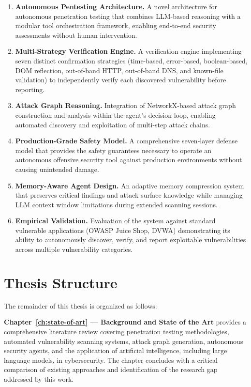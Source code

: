 \begin{enumerate}[label=\textbf{C\arabic*.}]
    \item \textbf{Autonomous Pentesting Architecture.} A novel architecture for autonomous penetration testing that combines LLM-based reasoning with a modular tool orchestration framework, enabling end-to-end security assessments without human intervention.
    \item \textbf{Multi-Strategy Verification Engine.} A verification engine implementing seven distinct confirmation strategies (time-based, error-based, boolean-based, DOM reflection, out-of-band HTTP, out-of-band DNS, and known-file validation) to independently verify each discovered vulnerability before reporting.
    \item \textbf{Attack Graph Reasoning.} Integration of NetworkX-based attack graph construction and analysis within the agent's decision loop, enabling automated discovery and exploitation of multi-step attack chains.
    \item \textbf{Production-Grade Safety Model.} A comprehensive seven-layer defense model that provides the safety guarantees necessary to operate an autonomous offensive security tool against production environments without causing unintended damage.
    \item \textbf{Memory-Aware Agent Design.} An adaptive memory compression system that preserves critical findings and attack surface knowledge while managing LLM context window limitations during extended scanning sessions.
    \item \textbf{Empirical Validation.} Evaluation of the system against standard vulnerable applications (OWASP Juice Shop, DVWA) demonstrating its ability to autonomously discover, verify, and report exploitable vulnerabilities across multiple vulnerability categories.
\end{enumerate}

\section{Thesis Structure}
\label{sec:thesis-structure}

The remainder of this thesis is organized as follows:

\textbf{Chapter~\ref{ch:state-of-art} --- Background and State of the Art} provides a comprehensive literature review covering penetration testing methodologies, automated vulnerability scanning systems, attack graph generation, autonomous security agents, and the application of artificial intelligence, including large language models, in cybersecurity. The chapter concludes with a critical comparison of existing approaches and identification of the research gap addressed by this work.


